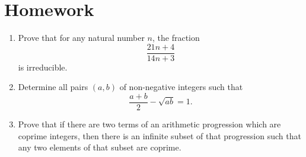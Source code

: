 \documentclass{article}
\begin{document}
\section{Homework}
\begin{enumerate}
	\item Prove that for any natural number $n$, the fraction
	      \[\frac{21n+4}{14n+3}\]
	      is irreducible.
	\item Determine all pairs $(a,b)$ of non-negative integers such that
	      \[\frac{a+b}2-\sqrt{ab}=1.\]
	\item Prove that if there are two terms of an arithmetic progression which are
	      coprime integers, then there is an infinite subset of that
	      progression such that any two elements of that subset are coprime.
\end{enumerate}
\end{document}
